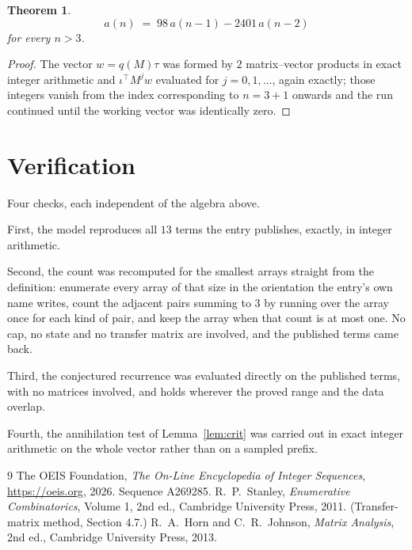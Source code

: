 \documentclass[11pt,a4paper]{article}
\theoremstyle{plain}
\newtheorem{theorem}{Theorem}
\theoremstyle{definition}
\begin{document}
\begin{theorem}
\[
a(n)\;=\;98\,a(n-1) - 2401\,a(n-2)
\]
for every $n>3$.
\end{theorem}

\begin{proof}
The vector $w=q(M)\tau$ was formed by $2$ matrix--vector products in exact integer
arithmetic and $\iota^{\!\top}M^{j}w$ evaluated for $j=0,1,\dots$, again exactly; those
integers vanish from the index corresponding to $n=3+1$ onwards and the run continued
until the working vector was identically zero.
\end{proof}

\section{Verification}

Four checks, each independent of the algebra above.

First, the model reproduces all $13$ terms the entry publishes, exactly, in integer
arithmetic.

Second, the count was recomputed for the smallest arrays straight from the definition:
enumerate every array of that size in the orientation the entry's own name writes, count the
adjacent pairs summing to $3$ by running over the array once for each kind of pair, and keep
the array when that count is at most one. No cap, no state and no transfer matrix are involved, and
the published terms came back.

Third, the conjectured recurrence was evaluated directly on the published terms, with no
matrices involved, and holds wherever the proved range and the data overlap.

Fourth, the annihilation test of Lemma~\ref{lem:crit} was carried out in exact integer
arithmetic on the whole vector rather than on a sampled prefix.

\begin{thebibliography}{9}
 The OEIS Foundation, \emph{The On-Line Encyclopedia of Integer
Sequences}, \url{https://oeis.org}, 2026. Sequence A269285.
 R.~P.~Stanley, \emph{Enumerative Combinatorics}, Volume 1, 2nd ed.,
Cambridge University Press, 2011. (Transfer-matrix method, Section 4.7.)
 R.~A.~Horn and C.~R.~Johnson, \emph{Matrix Analysis}, 2nd ed., Cambridge
University Press, 2013.
\end{thebibliography}
\end{document}
